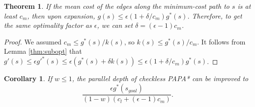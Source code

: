 \documentclass[letterpaper]{article}
\newtheorem{thm}{Theorem}
\newtheorem{cor}{Corollary}
\begin{document}
\begin{thm}
\label{thm:delta}
If the mean cost of the edges along the minimum-cost path to $s$ is at least $c_m$, then upon expansion, $g(s) \le \epsilon(1+\delta/c_m)g^*(s)$. Therefore, to get the same optimality factor as $\epsilon$, we can set $\delta = (\epsilon-1)c_m$.
\end{thm}

\begin{proof}
We assumed $c_m \le g^*(s) / k(s)$, so $k(s) \le g^*(s) / c_m$.
It follows from Lemma \ref{thm:subopt} that $g'(s) \le \epsilon g'^*(s) \le \epsilon(g^*(s) + \delta k(s)) \le \epsilon(1+\delta/c_m)g^*(s)$.
\end{proof}

\begin{cor}
\label{cor:delta}
If $w \le 1$, the parallel depth of checkless PAPA* can be improved to
\[\frac{\epsilon g^*(s_{goal})}{(1-w)(c_l+(\epsilon-1)c_m)}.\]
\end{cor}



\end{document}
